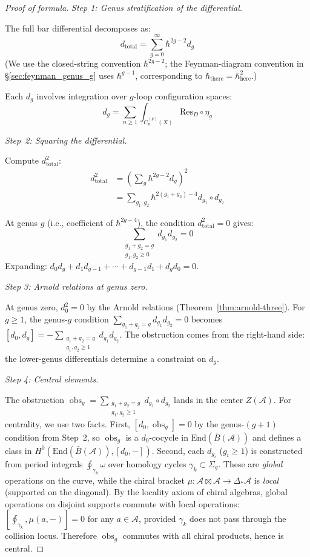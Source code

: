 \begin{proof}[Proof of formula]

\emph{Step 1: Genus stratification of the differential.}

The full bar differential decomposes as:
\[d_{\text{total}} = \sum_{g=0}^{\infty} \hbar^{2g-2} d_g\]
(We use the closed-string convention $\hbar^{2g-2}$; the Feynman-diagram convention in \S\ref{sec:feynman_genus_g} uses $\hbar^{g-1}$, corresponding to $\hbar_{\text{there}} = \hbar_{\text{here}}^2$.)

Each $d_g$ involves integration over $g$-loop configuration spaces:
\[d_g = \sum_{n \geq 1} \int_{\overline{C}_n^{(g)}(X)} \text{Res}_{D} \circ \eta_g\]

\emph{Step~2: Squaring the differential.}

Compute $d_{\mathrm{total}}^2$:
\begin{align*}
d_{\text{total}}^2 &= \left(\sum_{g} \hbar^{2g-2} d_g\right)^2 \\
&= \sum_{g_1, g_2} \hbar^{2(g_1+g_2)-4} d_{g_1} \circ d_{g_2}
\end{align*}

At genus $g$ (i.e., coefficient of $\hbar^{2g-4}$), the condition $d_{\text{total}}^2 = 0$ gives:
\[\sum_{\substack{g_1 + g_2 = g \\ g_1, g_2 \geq 0}} d_{g_1} d_{g_2} = 0\]
Expanding: $d_0 d_g + d_1 d_{g-1} + \cdots + d_{g-1} d_1 + d_g d_0 = 0$.

\emph{Step 3: Arnold relations at genus zero.}

At genus zero, $d_0^2 = 0$ by the Arnold relations (Theorem~\ref{thm:arnold-three}).
For $g \geq 1$, the genus-$g$ condition $\sum_{g_1+g_2=g} d_{g_1}d_{g_2} = 0$ becomes $[d_0, d_g] = -\sum_{\substack{g_1+g_2=g \\ g_1,g_2 \geq 1}} d_{g_1}d_{g_2}$.  The obstruction comes from the right-hand side: the lower-genus differentials determine a constraint on $d_g$.

\emph{Step 4: Central elements.}

The obstruction $\operatorname{obs}_g = \sum_{\substack{g_1+g_2=g \\ g_1,g_2 \geq 1}} d_{g_1} \circ d_{g_2}$ lands in the center $Z(\mathcal{A})$.  For centrality, we use two facts.  First, $[d_0, \operatorname{obs}_g] = 0$ by the genus-$(g{+}1)$ condition from Step~2, so $\operatorname{obs}_g$ is a $d_0$-cocycle in $\mathrm{End}(\bar{B}(\mathcal{A}))$ and defines a class in $H^0(\mathrm{End}(\bar{B}(\mathcal{A})), [d_0, -])$.  Second, each $d_{g_i}$ ($g_i \geq 1$) is constructed from period integrals $\oint_{\gamma_k} \omega$ over homology cycles $\gamma_k \subset \Sigma_g$.  These are \emph{global} operations on the curve, while the chiral bracket $\mu: \mathcal{A} \boxtimes \mathcal{A} \to \Delta_*\mathcal{A}$ is \emph{local} (supported on the diagonal).  By the locality axiom of chiral algebras, global operations on disjoint supports commute with local operations: $[\oint_{\gamma_k}, \mu(a, -)] = 0$ for any $a \in \mathcal{A}$, provided $\gamma_k$ does not pass through the collision locus.  Therefore $\operatorname{obs}_g$ commutes with all chiral products, hence is central.


\end{proof}
